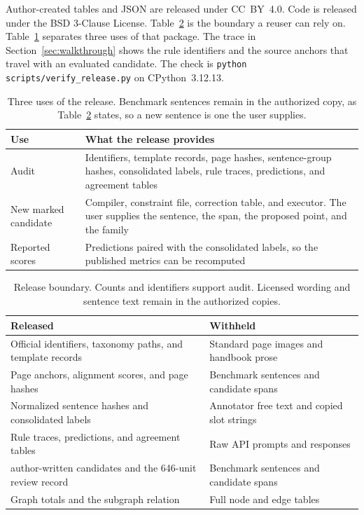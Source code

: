\documentclass[pdflatex,sn-mathphys,NameDate]{sn-jnl}
\begin{document}
Author-created tables and JSON are released under CC~BY~4.0.
Code is released under the BSD 3-Clause License.
Table~\ref{tab:release} is the boundary a reuser can rely on.
Table~\ref{tab:reuse} separates three uses of that package.
The trace in Section~\ref{sec:walkthrough} shows the rule identifiers and the source anchors that travel with an evaluated candidate.
The check is \texttt{python scripts/verify\_release.py} on CPython~3.12.13.

\begin{table}[!ht]
\centering
\small
{}
\begin{tabularx}{\textwidth}{@{}>{\raggedright\arraybackslash}p{}>{\raggedright\arraybackslash}X@{}}
\toprule
Use & What the release provides \\
\midrule
Audit & Identifiers, template records, page hashes, sentence-group hashes, consolidated labels, rule traces, predictions, and agreement tables \\
New marked candidate & Compiler, constraint file, correction table, and executor. The user supplies the sentence, the span, the proposed point, and the family \\
Reported scores & Predictions paired with the consolidated labels, so the published metrics can be recomputed \\
\bottomrule
\end{tabularx}
\caption{Three uses of the release. Benchmark sentences remain in the authorized copy, as Table~\ref{tab:release} states, so a new sentence is one the user supplies.}
\label{tab:reuse}
\end{table}

\begin{table}[!ht]
\centering
\small
{}
\begin{tabularx}{\textwidth}{@{}>{\raggedright\arraybackslash}X>{\raggedright\arraybackslash}X@{}}
\toprule
Released & Withheld \\
\midrule
Official identifiers, taxonomy paths, and template records & Standard page images and handbook prose \\
Page anchors, alignment scores, and page hashes & Benchmark sentences and candidate spans \\
Normalized sentence hashes and consolidated labels & Annotator free text and copied slot strings \\
Rule traces, predictions, and agreement tables & Raw API prompts and responses \\
244 author-written candidates and the 646-unit review record & Benchmark sentences and candidate spans \\
Graph totals and the subgraph relation & Full node and edge tables \\
\bottomrule
\end{tabularx}
\caption{Release boundary. Counts and identifiers support audit. Licensed wording and sentence text remain in the authorized copies.}
\label{tab:release}
\end{table}
\end{document}
